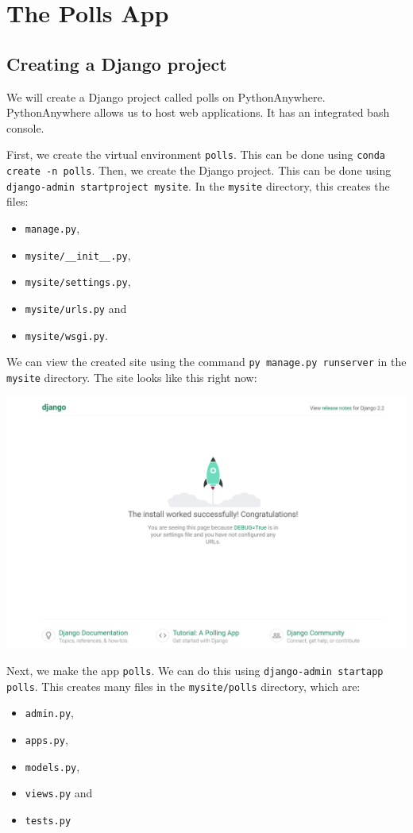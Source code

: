 \documentclass[a4paper, openany]{memoir}
\begin{document}
    \chapter{The Polls App}

    \section{Creating a Django project}
    We will create a Django project called polls on PythonAnywhere. PythonAnywhere allows us to host web applications. It has an integrated bash console.

    First, we create the virtual environment \texttt{polls}. This can be done using \texttt{conda create -n polls}. Then, we create the Django project. This can be done using \texttt{django-admin startproject mysite}. In the \texttt{mysite} directory, this creates the files:
    \begin{itemize}
        \item \texttt{manage.py},
        \item \texttt{mysite/\_\_init\_\_.py},
        \item \texttt{mysite/settings.py}, 
        \item \texttt{mysite/urls.py} and 
        \item \texttt{mysite/wsgi.py}.
    \end{itemize}
    We can view the created site using the command \texttt{py manage.py runserver} in the \texttt{mysite} directory. The site looks like this right now:
    \begin{center}
        \includegraphics[scale=0.4]{src/Django1.PNG}
    \end{center}
    Next, we make the app \texttt{polls}. We can do this using \texttt{django-admin startapp polls}. This creates many files in the \texttt{mysite/polls} directory, which are: 
    \begin{itemize}
        \item \texttt{admin.py}, 
        \item \texttt{apps.py}, 
        \item \texttt{models.py}, 
        \item \texttt{views.py} and 
        \item \texttt{tests.py}
    \end{itemize}
    \newpage
\end{document}
